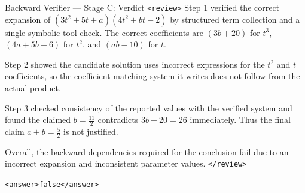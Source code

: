 \documentclass[11pt]{article}
\begin{document}
\begin{exbox}{Backward Verifier — Stage C: Verdict}
\texttt{<review>}
Step 1 verified the correct expansion of
$(3t^2+5t+a)(4t^2+bt-2)$ by structured term collection and a single symbolic
tool check. The correct coefficients are
$(3b+20)$ for $t^3$, $(4a+5b-6)$ for $t^2$, and $(ab-10)$ for $t$.

Step 2 showed the candidate solution uses incorrect expressions for the $t^2$
and $t$ coefficients, so the coefficient-matching system it writes does not
follow from the actual product.

Step 3 checked consistency of the reported values with the verified system
and found the claimed $b=\frac{11}{2}$ contradicts $3b+20=26$ immediately.
Thus the final claim $a+b=\frac{5}{2}$ is not justified.

Overall, the backward dependencies required for the conclusion fail due to an
incorrect expansion and inconsistent parameter values.
\texttt{</review>}

\texttt{<answer>false</answer>}
\end{exbox}
\end{document}

